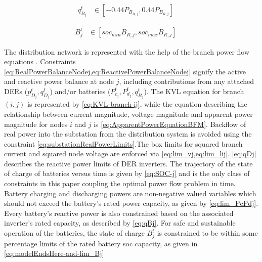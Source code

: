\documentclass[../../outputs/main.tex]{subfiles}
\begin{document}
\vspace{-1.5em} %

\begin{align}
    { q^{t}_{B_{j}} } 
    &\in 
    { \left[-0.44P_{B_{R, j}}, 0.44P_{B_{R, j}}\right] } \label{eq:qBj} &&
\end{align}

\vspace{-1.5em} %

\begin{align}
    { B^{t}_{j} } &\in { \left[ soc_{min}B_{R, j}, soc_{max}B_{R, j} \right] } \label{eq:modelEndsHere-and-lim_Bj} &&
\end{align}

The distribution network is represented with the help of the branch power flow equations . Constraints \cref{eq:RealPowerBalanceNodej,eq:ReactivePowerBalanceNodej} signify the active and reactive power balance at node $j$, including contributions from any attached DERs ($p^t_{D_j} , q^t_{D_j}$) and/or batteries ($P^t_{c_j}, P^t_{d_j}, q^t_{B_j}$). 
The KVL equation for branch $(i, j)$ is represented by \cref{eq:KVL-branch-ij}, while the equation describing the relationship between current magnitude, voltage magnitude and apparent power magnitude for nodes $i$ and $j$ is \cref{eq:ApparentPowerEquationBFM}. Backflow of real power into the substation from the distribution system is avoided using the constraint \cref{eq:substationRealPowerLimits}.The box limits for squared branch current and squared node voltage are enforced via \cref{eq:lim_vj,eq:lim_lij}. \cref{eq:qDj} describes the reactive power limits of DER inverters. The trajectory of the state of charge of batteries versus time is given by \cref{eq:SOC-j} and is the only class of constraints in this paper coupling the optimal power flow problem in time. Battery charging and discharging powers are non-negative valued variables which should not exceed the battery's rated power capacity, as given by \cref{eq:lim_PcPdj}. Every battery's reactive power is also constrained based on the associated inverter's rated capacity, as described by \cref{eq:qBj}. For safe and sustainable operation of the batteries, the state of charge $B^{t}_{j}$ is constrained to be within some percentage limits of the rated battery soc capacity, as given in \cref{eq:modelEndsHere-and-lim_Bj}
\end{document}

